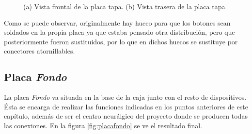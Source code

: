 \begin{figure}[htpb]%
    \centering 
    \hspace{10pt}%
    \caption{(a) Vista frontal de la placa tapa. (b) Vista trasera de la placa tapa}
    \label{fig:placatapa} 
    \end{figure} 

Como se puede observar, originalmente hay hueco para que los botones sean soldados en la propia placa ya 
que estaba pensado otra distribución, pero que posteriormente fueron sustituidos, por lo que en dichos 
huecos se sustituye por conectores atornillables.
    
\subsection{Placa \textit{Fondo}}

La placa \textit{Fondo} va situada en la base de la caja junto con el resto de dispositivos. Ésta se encarga
de realizar las funciones indicadas en los puntos anteriores de este capítulo, además de ser el centro neurálgico
del proyecto donde se producen todas las conexiones. En la figura \ref{fig:placafondo} se ve el resultado final.

